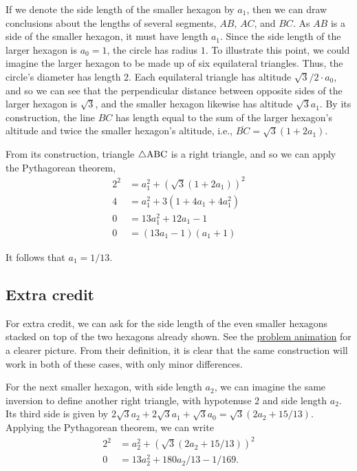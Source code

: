 \documentclass[reqno]{amsart}
\begin{document}
If we denote the side length of the smaller hexagon by $a_1$, then we can draw conclusions about the lengths of several segments, $AB$, $AC$, and $BC$. As $AB$ is a side of the smaller hexagon, it must have length $a_1$. Since the side length of the larger hexagon is $a_0=1$, the circle has radius $1$. To illustrate this point, we could imagine the larger hexagon to be made up of six equilateral triangles. Thus, the circle's diameter has length 2. Each equilateral triangle has altitude $\sqrt{3}/2\cdot a_0$, and so we can see that the perpendicular distance between opposite sides of the larger hexagon is $\sqrt{3}$, and the smaller hexagon likewise has altitude $\sqrt{3} a_1$. By its construction, the line $BC$ has length equal to the sum of the larger hexagon's altitude and twice the smaller hexagon's altitude, i.e., $\overline{BC}=\sqrt{3}(1+2a_1)$. 

From its construction, triangle $\triangle{\rm ABC}$ is a right triangle, and so we can apply the Pythagorean theorem, 
\begin{align*}
2^2 &= a_1^2 + \left(\sqrt{3}(1+2a_1)\right)^2 \\
4 &= a_1^2 + 3(1+4a_1 + 4a_1^2) \\
0 &= 13 a_1^2 + 12 a_1 - 1 \\
0 &= (13a_1-1)(a_1+1)
\end{align*}  

It follows that $a_1 = 1/13$.

\subsection*{Extra credit}

For extra credit, we can ask for the side length of the even smaller hexagons stacked on top of the two hexagons already shown. See the \href{https://fivethirtyeight.com/features/can-you-design-the-perfect-wedding/}{problem animation} for a clearer picture. From their definition, it is clear that the same construction will work in both of these cases, with only minor differences. 

For the next smaller hexagon, with side length $a_2$, we can imagine the same inversion to define another right triangle, with hypotenuse 2 and side length $a_2$. Its third side is given by $2\sqrt{3}a_2+2\sqrt{3}a_1+\sqrt{3}a_0=\sqrt{3}(2a_2 + 15/13)$. Applying the Pythagorean theorem, we can write 
\begin{align*}
2^2 &= a_2^2 + \left( \sqrt{3}(2a_2 + 15/13) \right)^2 \\
0 &= 13 a_2^2 + 180a_2/13 - 1/169.
\end{align*}
\end{document}
